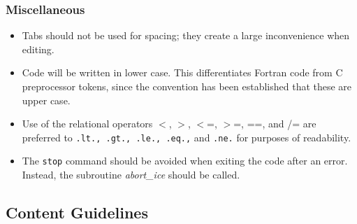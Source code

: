 
\subsubsection*{Miscellaneous}
\begin{itemize}
\item Tabs should not be used for spacing; they create a large inconvenience
      when editing.
\item Code will be written in lower case.  This differentiates Fortran code
      from C preprocessor tokens, since the convention has been established
      that these are upper case.
\item Use of the relational operators $<$, $>$, $<$=, $>$=, ==, and /= are preferred
      to {\tt .lt., .gt., .le., .eq.,} and {\tt .ne.} for purposes of readability.
\item The {\tt stop} command should be avoided when exiting the code after an
      error. Instead, the subroutine {\it abort\_ice} should be called.
\end{itemize}

\subsection{Content Guidelines}


